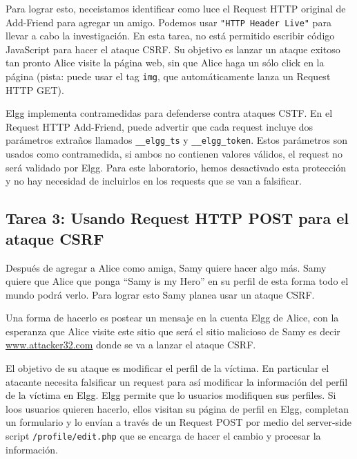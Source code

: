 Para lograr esto, neceistamos identificar como luce el Request HTTP original de Add-Friend para agregar un amigo. Podemos usar \texttt{"HTTP Header Live"} para llevar a cabo la investigación.
En esta tarea, no está permitido escribir código JavaScript para hacer el ataque CSRF. Su objetivo es lanzar un ataque exitoso tan pronto Alice visite la página web, sin que Alice haga un sólo click en la página (pista: puede usar el tag {\tt img}, que automáticamente lanza un Request HTTP GET).

Elgg implementa contramedidas para defenderse contra ataques CSTF. En el Request HTTP Add-Friend, puede advertir que cada request incluye dos parámetros extraños llamados \texttt{\_\_elgg\_ts} y  \texttt{\_\_elgg\_token}. Estos parámetros son usados como contramedida, si ambos no contienen valores válidos, el request no será validado por Elgg.
Para este laboratorio, hemos desactivado esta protección y no hay necesidad de incluirlos en los requests que se van a falsificar.


\subsection{Tarea 3: Usando Request HTTP POST para el ataque CSRF}

Después de agregar a Alice como amiga, Samy quiere hacer algo más. Samy quiere que Alice que ponga ``Samy is my Hero'' en su perfil de esta forma todo el mundo podrá verlo. Para lograr esto Samy planea usar un ataque CSRF.

Una forma de hacerlo es postear un mensaje en la cuenta Elgg de Alice, con la esperanza que Alice visite este sitio que será el sitio malicioso de Samy es decir \url{www.attacker32.com} donde se va a lanzar el ataque CSRF.

El objetivo de su ataque es modificar el perfil de la víctima. En particular el atacante necesita falsificar un request para así modificar la información del perfil de la víctima en Elgg. Elgg permite que lo usuarios modifiquen sus perfiles. Si loos usuarios quieren hacerlo, ellos visitan su página de perfil en Elgg, completan un formulario y lo envían a través de un Request POST por medio del server-side script {\tt /profile/edit.php} que se encarga de hacer el cambio y procesar la información.

